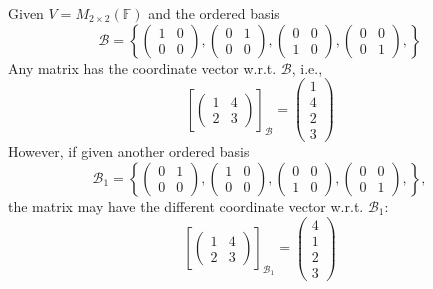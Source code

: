 \begin{example}
Given $V=M_{2\times 2}(\mathbb{F})$ and the ordered basis
\[
\mathcal{B}=
\left\{
\begin{pmatrix}
1&0\\0&0
\end{pmatrix},
\begin{pmatrix}
0&1\\0&0
\end{pmatrix},
\begin{pmatrix}
0&0\\1&0
\end{pmatrix},
\begin{pmatrix}
0&0\\0&1
\end{pmatrix},
\right\}
\]
Any matrix has the coordinate vector w.r.t. $\mathcal{B}$, i.e.,
\[
\left[
\begin{pmatrix}
1&4\\2&3
\end{pmatrix}
\right]_{\mathcal{B}}
=
\begin{pmatrix}
1\\4\\2\\3
\end{pmatrix}
\]
However, if given another ordered basis
\[
\mathcal{B}_1=
\left\{
\begin{pmatrix}
0&1\\0&0
\end{pmatrix},
\begin{pmatrix}
1&0\\0&0
\end{pmatrix},
\begin{pmatrix}
0&0\\1&0
\end{pmatrix},
\begin{pmatrix}
0&0\\0&1
\end{pmatrix},
\right\},
\]
the matrix may have the different coordinate vector w.r.t. $\mathcal{B}_1$:
\[
\left[
\begin{pmatrix}
1&4\\2&3
\end{pmatrix}
\right]_{\mathcal{B}_1}
=
\begin{pmatrix}
4\\1\\2\\3
\end{pmatrix}
\]
\end{example}

